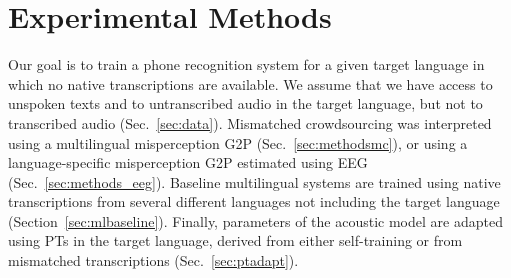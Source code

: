 \section{Experimental Methods}
\label{sec:methods}

Our goal is to train a phone recognition system for a given target
language in which no native transcriptions are available. We assume
that we have access to unspoken texts and to untranscribed audio in
the target language, but not to transcribed audio
(Sec.~\ref{sec:data}).  Mismatched crowdsourcing was interpreted using
a multilingual misperception G2P (Sec.~\ref{sec:methodsmc}), or using
a language-specific misperception G2P estimated using EEG
(Sec.~\ref{sec:methods_eeg}).  Baseline multilingual systems are
trained using native transcriptions from several different languages
not including the target language (Section~\ref{sec:mlbaseline}).
Finally, parameters of the acoustic model are adapted using PTs in the
target language, derived from either self-training or from mismatched
transcriptions (Sec.~\ref{sec:ptadapt}).

